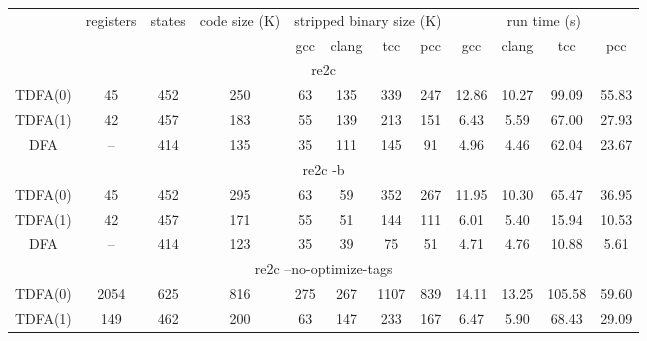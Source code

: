 \documentclass{article}
\newenvironment{Xtab}
    {\par\medskip\noindent\minipage{\linewidth}\begin{center}}
    {\end{center}\endminipage\par\medskip}
\theoremstyle{definition}
\begin{document}
\begin{Xtab}\label{table1}
\begin{center}
    \begin{tabular}{|c|ccccccccccc|}
    \hline
    & registers & states & code size (K) & \multicolumn{4}{c}{stripped binary size (K)} & \multicolumn{4}{c|}{run time (s)} \\
    & & &
        & gcc & clang & tcc & pcc
        & gcc & clang & tcc & pcc \\
    \hline \hline
    \multicolumn{12}{|c|}{re2c} \\
    \hline
    TDFA(0) & 45 & 452 & 250 & 63 & 135 & 339 & 247 & 12.86 & 10.27 & 99.09 & 55.83 \\
    TDFA(1) & 42 & 457 & 183 & 55 & 139 & 213 & 151 &  6.43 &  5.59 & 67.00 & 27.93 \\
    DFA     & -- & 414 & 135 & 35 & 111 & 145 &  91 &  4.96 &  4.46 & 62.04 & 23.67 \\
    \hline \hline
    \multicolumn{12}{|c|}{re2c -b} \\
    \hline
    TDFA(0) & 45 & 452 & 295 & 63 & 59 & 352 & 267 & 11.95 & 10.30 & 65.47 & 36.95 \\
    TDFA(1) & 42 & 457 & 171 & 55 & 51 & 144 & 111 &  6.01 &  5.40 & 15.94 & 10.53 \\
    DFA     & -- & 414 & 123 & 35 & 39 &  75 &  51 &  4.71 &  4.76 & 10.88 &  5.61 \\
    \hline \hline
    \multicolumn{12}{|c|}{re2c --no-optimize-tags} \\
    \hline
    TDFA(0) & 2054 & 625 & 816 & 275 & 267 & 1107 & 839 & 14.11 & 13.25 & 105.58 & 59.60 \\
    TDFA(1) &  149 & 462 & 200 &  63 & 147 &  233 & 167 &  6.47 &  5.90 &  68.43 & 29.09 \\
    \hline
    \end{tabular}
\end{center}
\end{Xtab}
\end{document}

